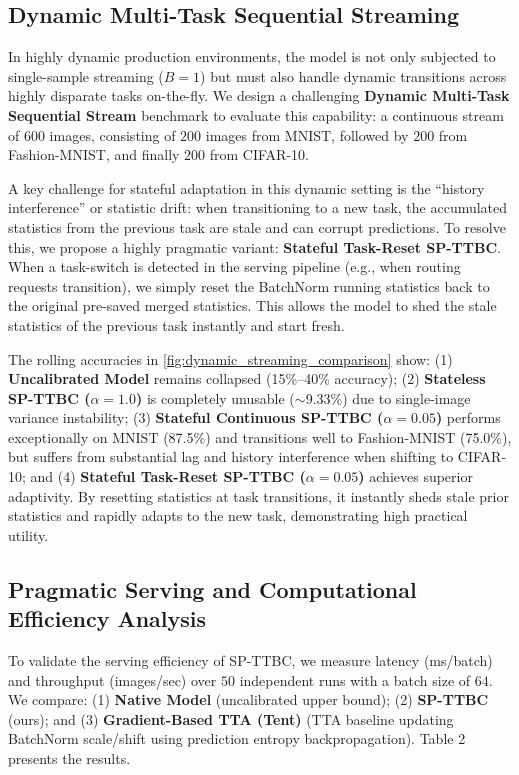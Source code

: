 \documentclass{article}
\theoremstyle{plain}
\theoremstyle{definition}
\theoremstyle{remark}
\begin{document}
\subsection{Dynamic Multi-Task Sequential Streaming}
In highly dynamic production environments, the model is not only subjected to single-sample streaming ($B=1$) but must also handle dynamic transitions across highly disparate tasks on-the-fly. We design a challenging \textbf{Dynamic Multi-Task Sequential Stream} benchmark to evaluate this capability: a continuous stream of $600$ images, consisting of $200$ images from MNIST, followed by $200$ from Fashion-MNIST, and finally $200$ from CIFAR-10.

A key challenge for stateful adaptation in this dynamic setting is the ``history interference'' or statistic drift: when transitioning to a new task, the accumulated statistics from the previous task are stale and can corrupt predictions. To resolve this, we propose a highly pragmatic variant: \textbf{Stateful Task-Reset SP-TTBC}. When a task-switch is detected in the serving pipeline (e.g., when routing requests transition), we simply reset the BatchNorm running statistics back to the original pre-saved merged statistics. This allows the model to shed the stale statistics of the previous task instantly and start fresh.

The rolling accuracies in \cref{fig:dynamic_streaming_comparison} show: (1) \textbf{Uncalibrated Model} remains collapsed (15\%--40\% accuracy); (2) \textbf{Stateless SP-TTBC ($\alpha=1.0$)} is completely unusable ($\sim$9.33\%) due to single-image variance instability; (3) \textbf{Stateful Continuous SP-TTBC ($\alpha=0.05$)} performs exceptionally on MNIST (87.5\%) and transitions well to Fashion-MNIST (75.0\%), but suffers from substantial lag and history interference when shifting to CIFAR-10; and (4) \textbf{Stateful Task-Reset SP-TTBC ($\alpha=0.05$)} achieves superior adaptivity. By resetting statistics at task transitions, it instantly sheds stale prior statistics and rapidly adapts to the new task, demonstrating high practical utility.

\subsection{Pragmatic Serving and Computational Efficiency Analysis}
\label{serving_analysis}

To validate the serving efficiency of SP-TTBC, we measure latency (ms/batch) and throughput (images/sec) over $50$ independent runs with a batch size of $64$. We compare: (1) \textbf{Native Model} (uncalibrated upper bound); (2) \textbf{SP-TTBC} (ours); and (3) \textbf{Gradient-Based TTA (Tent)} (TTA baseline updating BatchNorm scale/shift using prediction entropy backpropagation). Table 2 presents the results.
\end{document}
